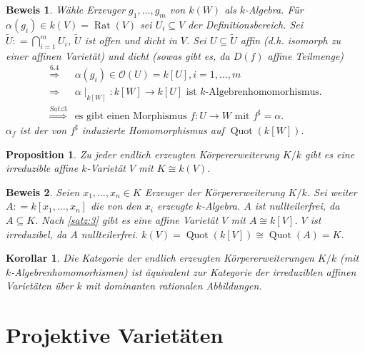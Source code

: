 \documentclass[a4paper,12pt]{report}
\theoremstyle{break}
\newtheorem{Prop}[Def]{Proposition}
\newtheorem{Kor}[Def]{Korollar}
\theoremstyle{nonumberbreak}
\theoremstyle{nonumberplain}
\newtheorem{Bew}{Beweis}
\newcommand{\defeqr}[0]{\mathrel{\mathop:}=}
\DeclareMathOperator{\Quot}{Quot}
\DeclareMathOperator{\Rat}{Rat}
\begin{document}
\begin{Bew}
  Wähle Erzeuger $g_1,\dots,g_m$ von $k(W)$ als $k$-Algebra. Für $\alpha(g_i)\in k(V)=\Rat(V)$ sei
  $U_i\subseteq V$ der Definitionsbereich. Sei $\tilde{U}\defeqr\bigcap_{i=1}^m U_i$, $\tilde{U}$ ist offen und dicht in $V$.
Sei $U\subseteq\tilde{U}$ affin (d.h. isomorph zu einer affinen Varietät) und dicht (sowas gibt es, da $D(f)$ affine Teilmenge)
\begin{align*}
\stackrel{6.4}{\Rightarrow}&\alpha(g_i)\in\mathcal O(U)=k[U], i=1,\dots,m \\
  \Rightarrow&\alpha\mid_{k[W]}:k[W]\longrightarrow k[U] \text{ ist $k$-Algebrenhomomorhismus.} \\
\stackrel{Satz 3}{\Rightarrow}&\text{es gibt einen Morphismus $f:U\longrightarrow W$ mit $f^\sharp=\alpha$.}
\end{align*}
$\alpha_f$ ist der von $f^\sharp$ induzierte Homomorphismus auf $\Quot(k[W])$.
\end{Bew}
\begin{Prop}
  \label{prop:7.4}
Zu jeder endlich erzeugten Körpererweiterung $K/k$ gibt es eine irreduzible affine $k$-Varietät $V$ mit $K\cong k(V)$.
\end{Prop}
\begin{Bew}
  Seien $x_1,\dots,x_n\in K$ Erzeuger der Körpererweiterung $K/k$. Sei weiter $A\defeqr k[x_1,\dots,x_n]$ die von
den $x_i$ erzeugte $k$-Algebra. $A$ ist nullteilerfrei, da $A\subseteq K$. Nach \ref{satz:3} gibt es eine 
affine Varietät $V$ mit $A\cong k[V]$. $V$ ist irreduzibel, da $A$ nullteilerfrei. $k(V)=\Quot(k[V])\cong\Quot(A)=K$.
\end{Bew}
\begin{Kor}
  \label{kor:7.5}
Die Kategorie der endlich erzeugten Körpererweiterungen $K/k$ (mit $k$-Algebrenhomomorhismen)
ist äquivalent zur Kategorie der irreduziblen affinen Varietäten über $k$ mit dominanten rationalen Abbildungen.
\end{Kor}
\chapter{Projektive Varietäten}
\setcounter{section}{7}
\end{document}
